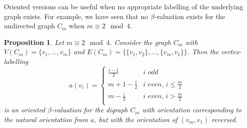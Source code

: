 \documentclass[12pt, a4paper]{article}
\newtheorem{proposition}[theorem]{Proposition}
\theoremstyle{definition}
\begin{document}
Oriented versions can be useful when no appropriate labelling of the underlying graph exists. For example, we have seen that no $\beta$-valuation exists for the undirected graph $C_m$ when $m \equiv 2 \mod 4$.

\begin{proposition}\label{thm:mcycle2mod4}
Let $m \equiv 2 \mod 4$. Consider the graph $C_m$ with $V(C_m)=\{v_1,\ldots,v_m\}$ and $E(C_m)=\{\{v_1,v_2\}, \ldots, \{v_m,v_1\}\}$. Then the vertex-labelling
\[a(v_i) = \begin{cases} 
          \frac{i-1}{2} & i \textit{ odd} \\
          m +1- \frac{i}{2} & i \textit{ even, }i \leq \frac{m}{2} \\
          m - \frac{i}{2} & i \textit{ even, }i > \frac{m}{2} \\
       \end{cases}
\]
is an oriented $\beta$-valuation for the digraph $C_m$ with orientation corresponding to the natural orientation from $a$, but with the orientation of $(v_m,v_1)$ reversed.
\end{proposition}
\end{document}
